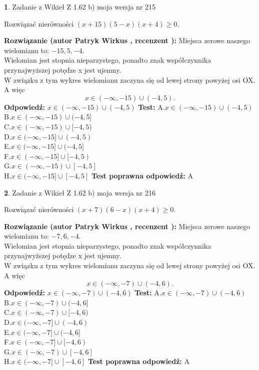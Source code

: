 \documentclass[12pt, a4paper]{article}
\theoremstyle{definition} %
\newtheorem{zad}{}
\newcommand{\zadStart}[1]{\begin{zad}#1\newline}
\newcommand{\zadStop}{\end{zad}}
\newcommand{\rozwStart}[2]{\noindent \textbf{Rozwiązanie (autor #1 , recenzent #2): }\newline}
\newcommand{\rozwStop}{\newline}
\newcommand{\odpStart}{\noindent \textbf{Odpowiedź:}\newline}
\newcommand{\odpStop}{\newline}
\newcommand{\testStart}{\noindent \textbf{Test:}\newline}
\newcommand{\testStop}{\newline}
\newcommand{\kluczStart}{\noindent \textbf{Test poprawna odpowiedź:}\newline}
\newcommand{\kluczStop}{\newline}
\begin{document}
\zadStart{Zadanie z Wikieł Z 1.62 b) moja wersja nr 215}

Rozwiązać nierówności $(x+15)(5-x)(x+4)\ge0$.
\zadStop
\rozwStart{Patryk Wirkus}{}
Miejsca zerowe naszego wielomianu to: $-15, 5, -4$.\\
Wielomian jest stopnia nieparzystego, ponadto znak współczynnika przy\linebreak najwyższej potędze x jest ujemny.\\ W związku z tym wykres wielomianu zaczyna się od lewej strony powyżej osi OX. A więc $$x \in (-\infty,-15) \cup (-4,5).$$
\rozwStop
\odpStart
$x \in (-\infty,-15) \cup (-4,5)$
\odpStop
\testStart
A.$x \in (-\infty,-15) \cup (-4,5)$\\
B.$x \in (-\infty,-15) \cup (-4,5]$\\
C.$x \in (-\infty,-15) \cup [-4,5)$\\
D.$x \in (-\infty,-15] \cup (-4,5)$\\
E.$x \in (-\infty,-15] \cup (-4,5]$\\
F.$x \in (-\infty,-15] \cup [-4,5)$\\
G.$x \in (-\infty,-15) \cup [-4,5]$\\
H.$x \in (-\infty,-15] \cup [-4,5]$
\testStop
\kluczStart
A
\kluczStop



\zadStart{Zadanie z Wikieł Z 1.62 b) moja wersja nr 216}

Rozwiązać nierówności $(x+7)(6-x)(x+4)\ge0$.
\zadStop
\rozwStart{Patryk Wirkus}{}
Miejsca zerowe naszego wielomianu to: $-7, 6, -4$.\\
Wielomian jest stopnia nieparzystego, ponadto znak współczynnika przy\linebreak najwyższej potędze x jest ujemny.\\ W związku z tym wykres wielomianu zaczyna się od lewej strony powyżej osi OX. A więc $$x \in (-\infty,-7) \cup (-4,6).$$
\rozwStop
\odpStart
$x \in (-\infty,-7) \cup (-4,6)$
\odpStop
\testStart
A.$x \in (-\infty,-7) \cup (-4,6)$\\
B.$x \in (-\infty,-7) \cup (-4,6]$\\
C.$x \in (-\infty,-7) \cup [-4,6)$\\
D.$x \in (-\infty,-7] \cup (-4,6)$\\
E.$x \in (-\infty,-7] \cup (-4,6]$\\
F.$x \in (-\infty,-7] \cup [-4,6)$\\
G.$x \in (-\infty,-7) \cup [-4,6]$\\
H.$x \in (-\infty,-7] \cup [-4,6]$
\testStop
\kluczStart
A
\kluczStop
\end{document}
